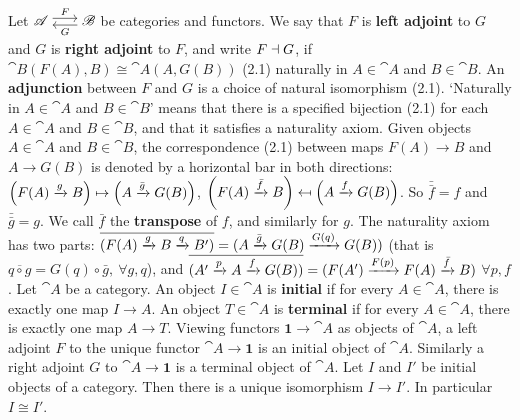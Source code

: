  Let $\cat A \isofuncs{F}{G} \cat B$ be categories and functors. We say that $F$ is \textbf{left adjoint} to $G$ and $G$ is \textbf{right adjoint} to $F$, and write $F \dashv G$, if $\cat B(F(A), B) \cong \cat A(A, G(B))$ (2.1) naturally in $A \in \cat A$ and $B \in \cat B$. An \textbf{adjunction} between $F$ and $G$ is a choice of natural isomorphism (2.1). `Naturally in $A \in \cat A$ and $B \in \cat B$' means that there is a specified bijection (2.1) for each $A \in \cat A$ and $B \in \cat B$, and that it satisfies a naturality axiom. 
 Given objects $A \in \cat A$ and $B \in \cat B$, the correspondence (2.1) between maps $F(A) \to B$ and $A \to G(B)$ is denoted by a horizontal bar in both directions: $\left(F(A) \xrightarrow[]{g} B\right) \mapsto \left(A \xrightarrow[]{\bar{g}} G(B)\right)$, $\left(F(A) \xrightarrow[]{\bar{f}} B\right) \mapsfrom \left(A \xrightarrow[]{f} G(B)\right)$. So $\bar{\bar{f}} = f$ and $\bar{\bar{g}} = g$. We call $\bar{f}$ the \textbf{transpose} of $f$, and similarly for $g$. 
 The naturality axiom has two parts: $\overline{(F(A) \xrightarrow[]{g} B \xrightarrow[]{q} B')} = (A \xrightarrow[]{\bar{g}} G(B) \xrightarrow[]{G(q)} G(B))$ (that is $\overline{q \circ g} = G(q) \circ \bar{g},\ \forall g,q$), and $\overline{(A' \xrightarrow[]{p} A \xrightarrow[]{f} G(B))} = (F(A') \xrightarrow[]{F(p)} F(A) \xrightarrow[]{\bar{f}} B)$ $\forall p,f$.
 Let $\cat A$ be a category. An object $I \in \cat A$ is \textbf{initial} if for every $A \in \cat A$, there is exactly one map $I \to A$. An object $T \in \cat A$ is \textbf{terminal} if for every $A \in \cat A$, there is exactly one map $A \to T$.
 Viewing functors $\mathbf{1} \to \cat A$ as objects of $\cat A$, a left adjoint $F$ to the unique functor $\cat A \to \mathbf{1}$ is an initial object of $\cat A$. Similarly a right adjoint $G$ to $\cat A \to \mathbf{1}$ is a terminal object of $\cat A$.
 Let $I$ and $I'$ be initial objects of a category. Then there is a unique isomorphism $I \to I'$. In particular $I \cong I'$.